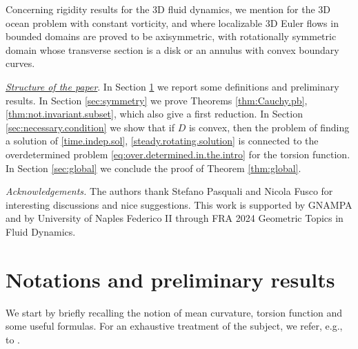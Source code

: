 \documentclass[10pt,reqno,a4paper]{article}
\numberwithin{equation}{section}
\theoremstyle{plain}
\theoremstyle{definition}
\begin{document}
Concerning rigidity results for the 3D fluid dynamics, 
we mention \cite{Wahlen} for the 3D ocean problem with constant vorticity, 
and \cite{Peralta.Salas} where localizable 3D Euler flows in bounded domains 
are proved to be axisymmetric, with rotationally symmetric domain 
whose transverse section is a disk or an annulus with convex boundary curves. 




\medskip

\underline{{\it Structure of the paper}}.
In Section \ref{sec:prel} we report some definitions and preliminary results.
In Section \ref{sec:symmetry} we prove Theorems \ref{thm:Cauchy.pb}, \ref{thm:not.invariant.subset},
which also give a first reduction. 
In Section \ref{sec:necessary.condition} we show 
that if $D$ is convex, then the problem of finding a solution of \eqref{time.indep.sol}, 
\eqref{steady.rotating.solution} is connected to the overdetermined problem 
\eqref{eq:over.determined.in.the.intro} for the torsion function.
In Section \ref{sec:global} we conclude the proof of Theorem \ref{thm:global}. 

\medskip

\emph{Acknowledgements.} The authors thank Stefano Pasquali and Nicola Fusco 
for interesting discussions and nice suggestions.
This work is supported by GNAMPA 
and by University of Naples Federico II through FRA 2024 Geometric Topics in Fluid Dynamics.


\section{Notations and preliminary results} \label{sec:prel}
We start by briefly recalling  the notion of mean curvature, torsion function  and some useful formulas. 
For an exhaustive treatment of the subject, we refer, e.g., to \cite{Mantegazza}.
\end{document}
